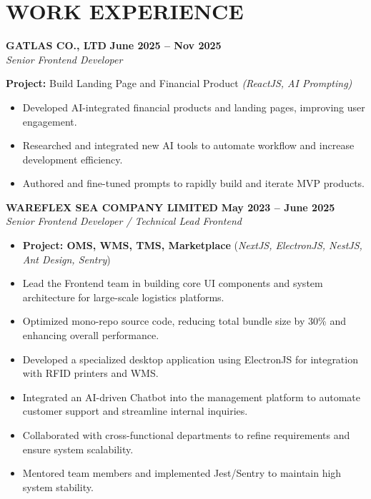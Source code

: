 \documentclass[11pt,a4paper]{article}
\begin{document}
\vspace{8pt}

\section*{WORK EXPERIENCE}

\noindent \textbf{GATLAS CO., LTD} \hfill \textbf{June 2025 -- Nov 2025} \\
\textit{Senior Frontend Developer}

\noindent \textbf{Project:} Build Landing Page and Financial Product \textit{(ReactJS, AI Prompting)}
\begin{itemize}
    \item Developed AI-integrated financial products and landing pages, improving user engagement.
    \item Researched and integrated new AI tools to automate workflow and increase development efficiency.
    \item Authored and fine-tuned prompts to rapidly build and iterate MVP products.
\end{itemize}

\vspace{8pt} %

\noindent \textbf{WAREFLEX SEA COMPANY LIMITED} \hfill \textbf{May 2023 -- June 2025} \\
\textit{Senior Frontend Developer / Technical Lead Frontend}
\begin{itemize}
    \item \textbf{Project: OMS, WMS, TMS, Marketplace} (\textit{NextJS, ElectronJS, NestJS, Ant Design, Sentry})
    \item Lead the Frontend team in building core UI components and system architecture for large-scale logistics platforms.
    \item Optimized mono-repo source code, reducing total bundle size by 30\% and enhancing overall performance.
    \item Developed a specialized desktop application using ElectronJS for integration with RFID printers and WMS.
    \item Integrated an AI-driven Chatbot into the management platform to automate customer support and streamline internal inquiries.
    \item Collaborated with cross-functional departments to refine requirements and ensure system scalability.
    \item Mentored team members and implemented Jest/Sentry to maintain high system stability.
\end{itemize}
\end{document}
